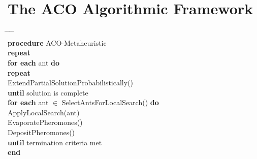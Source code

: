 \section{The ACO Algorithmic Framework}

\begin{algorithm}
\begin{tabbing}
\hspace*{1cm} \= \hspace*{1cm} \= \hspace*{1cm} \= \hspace*{1cm} \= \hspace*{1cm} \= \\
\textbf{procedure} ACO-Metaheuristic \\
\> \textbf{repeat} \\
\> \> \textbf{for each} ant \textbf{do} \\
\> \> \> \textbf{repeat} \\
\> \> \> \> ExtendPartialSolutionProbabilistically() \\
\> \> \> \textbf{until} solution is complete \\
\> \> \textbf{for each} ant $\in$ SelectAntsForLocalSearch() \textbf{do} \\
\> \> \> ApplyLocalSearch(ant) \\
\> \> EvaporatePheromones() \\
\> \> DepositPheromones() \\
\> \textbf{until} termination criteria met \\
\textbf{end}
\end{tabbing}
\end{algorithm}
